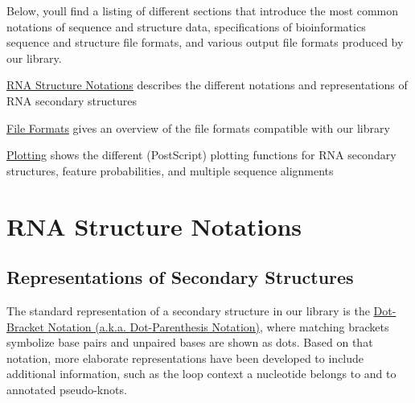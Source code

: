 Below, you\textquotesingle{}ll find a listing of different sections that introduce the most common notations of sequence and structure data, specifications of bioinformatics sequence and structure file formats, and various output file formats produced by our library.


\begin{DoxyItemize}
\item \hyperlink{rna_structure_notations}{R\+NA Structure Notations} describes the different notations and representations of R\+NA secondary structures
\item \hyperlink{file_formats}{File Formats} gives an overview of the file formats compatible with our library
\item \hyperlink{plots}{Plotting} shows the different (Post\+Script) plotting functions for R\+NA secondary structures, feature probabilities, and multiple sequence alignments 
\end{DoxyItemize}\hypertarget{rna_structure_notations}{}\section{R\+NA Structure Notations}\label{rna_structure_notations}
\hypertarget{rna_structure_notations_sec_structure_representations}{}\subsection{Representations of Secondary Structures}\label{rna_structure_notations_sec_structure_representations}
The standard representation of a secondary structure in our library is the \hyperlink{rna_structure_notations_dot-bracket-notation}{Dot-\/\+Bracket Notation (a.\+k.\+a. Dot-\/\+Parenthesis Notation)}, where matching brackets symbolize base pairs and unpaired bases are shown as dots. Based on that notation, more elaborate representations have been developed to include additional information, such as the loop context a nucleotide belongs to and to annotated pseudo-\/knots.

